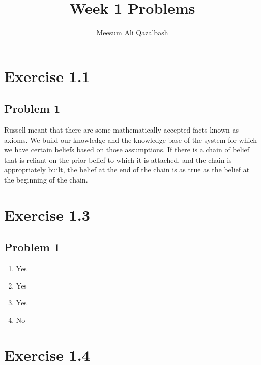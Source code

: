 \documentclass[answers]{exam}
\title{Week 1 Problems}
\author{Meesum Ali Qazalbash}
\theoremstyle{mytheoremstyle}
\theoremstyle{mytheoremstyle}
\theoremstyle{myproblemstyle}
\begin{document}
\maketitle

\section*{Exercise 1.1}

\subsection*{Problem 1}
\begin{framed}
    Russell meant that there are some mathematically accepted facts known as axioms. We build our knowledge and the knowledge base of the system for which we have certain beliefs based on those assumptions. If there is a chain of belief that is reliant on the prior belief to which it is attached, and the chain is appropriately built, the belief at the end of the chain is as true as the belief at the beginning of the chain.
\end{framed}

\section*{Exercise 1.3}

\subsection*{Problem 1}
\begin{framed}
    \begin{enumerate}
        \item Yes
        \item Yes
        \item Yes
        \item No
    \end{enumerate}
\end{framed}

\section*{Exercise 1.4}
\end{document}
